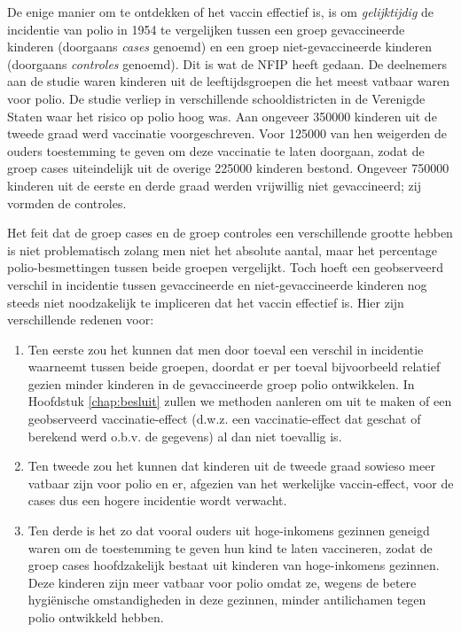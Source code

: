 \documentclass[
  12pt,dutch,coursenotes]{book}
\providecommand{\tightlist}{%
  \setlength{\itemsep}{0pt}\setlength{\parskip}{0pt}}
\theoremstyle{definition}
\theoremstyle{definition}
\theoremstyle{definition}
\theoremstyle{remark}
\begin{document}
De enige manier om te ontdekken of het vaccin effectief is, is om \emph{gelijktijdig} de incidentie van polio in 1954 te vergelijken tussen een
groep gevaccineerde kinderen (doorgaans \emph{cases} genoemd) en een groep
niet-gevaccineerde kinderen (doorgaans \emph{controles} genoemd). Dit is
wat de NFIP heeft gedaan. De deelnemers aan de studie waren kinderen uit de
leeftijdsgroepen die het meest vatbaar waren voor polio. De studie verliep in
verschillende schooldistricten in de Verenigde Staten waar het risico op
polio hoog was. Aan ongeveer 350000 kinderen uit de tweede graad werd
vaccinatie voorgeschreven. Voor 125000 van hen weigerden de ouders
toestemming te geven om deze vaccinatie te laten doorgaan, zodat de groep
cases uiteindelijk uit de overige 225000 kinderen bestond. Ongeveer
750000 kinderen uit de eerste en derde graad werden vrijwillig niet
gevaccineerd; zij vormden de controles.

Het feit dat de groep cases en de groep controles een verschillende grootte
hebben is niet problematisch zolang men niet het absolute aantal, maar het
percentage polio-besmettingen tussen beide groepen vergelijkt. Toch hoeft
een geobserveerd verschil in incidentie tussen gevaccineerde en
niet-gevaccineerde kinderen nog steeds niet noodzakelijk te impliceren dat
het vaccin effectief is. Hier zijn verschillende redenen voor:

\begin{enumerate}
\def\labelenumi{\arabic{enumi}.}
\tightlist
\item
  Ten eerste zou het kunnen dat men door toeval een verschil in
  incidentie waarneemt tussen beide groepen, doordat er per toeval
  bijvoorbeeld relatief gezien minder kinderen in de gevaccineerde groep polio
  ontwikkelen. In Hoofdstuk \ref{chap:besluit} zullen we methoden aanleren om
  uit te maken of een geobserveerd vaccinatie-effect (d.w.z. een
  vaccinatie-effect dat geschat of berekend werd o.b.v. de gegevens) al dan
  niet toevallig is.
\item
  Ten tweede zou het kunnen dat kinderen uit de tweede graad sowieso
  meer vatbaar zijn voor polio en er, afgezien van het werkelijke
  vaccin-effect, voor de cases dus een hogere incidentie wordt verwacht.
\item
  Ten derde is het zo dat vooral ouders uit hoge-inkomens gezinnen
  geneigd waren om de toestemming te geven hun kind te laten vaccineren, zodat
  de groep cases hoofdzakelijk bestaat uit kinderen van hoge-inkomens
  gezinnen. Deze kinderen zijn meer vatbaar voor polio omdat ze, wegens de
  betere hygiënische omstandigheden in deze gezinnen, minder antilichamen
  tegen polio ontwikkeld hebben.
\end{enumerate}
\end{document}
